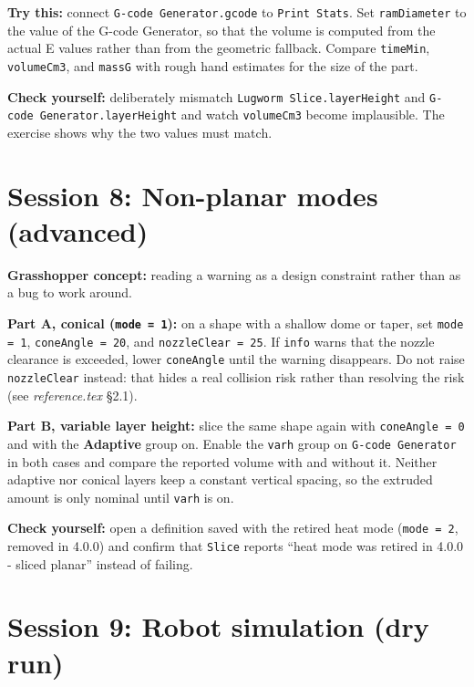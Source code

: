 \documentclass[11pt]{article}
\newcommand{\param}[1]{\texttt{#1}}
\newcommand{\exlabel}[1]{\par\vspace{0.3em}\noindent\textbf{#1:}\enspace}
\begin{document}
\exlabel{Try this} connect \param{G-code Generator.gcode} to
\param{Print Stats}. Set \param{ramDiameter} to the value of
the G-code Generator, so that the volume is computed from the actual E
values rather than from the geometric fallback. Compare
\param{timeMin}, \param{volumeCm3}, and \param{massG} with rough hand
estimates for the size of the part.

\exlabel{Check yourself} deliberately mismatch \param{Lugworm
Slice.layerHeight} and \param{G-code Generator.layerHeight} and
watch \param{volumeCm3} become implausible. The exercise shows why the
two values must match.

\section{Session 8: Non-planar modes (advanced)}

\exlabel{Grasshopper concept} reading a warning as a design constraint
rather than as a bug to work around.

\exlabel{Part A, conical (\param{mode = 1})} on a shape with a shallow
dome or taper, set \param{mode = 1}, \param{coneAngle = 20}, and
\param{nozzleClear = 25}. If \param{info} warns that the nozzle
clearance is exceeded, lower \param{coneAngle} until the warning
disappears. Do not raise \param{nozzleClear} instead: that hides a real
collision risk rather than resolving the risk (see \emph{reference.tex}
\S 2.1).

\exlabel{Part B, variable layer height} slice the same shape again with
\param{coneAngle = 0} and with the \textbf{Adaptive} group on. Enable
the \param{varh} group on \param{G-code Generator} in both cases
and compare the reported volume with and without it. Neither adaptive
nor conical layers keep a constant vertical spacing, so the extruded
amount is only nominal until \param{varh} is on.

\exlabel{Check yourself} open a definition saved with the retired heat
mode (\param{mode = 2}, removed in 4.0.0) and confirm that
\param{Slice} reports ``heat mode was retired in 4.0.0 - sliced
planar'' instead of failing.

\section{Session 9: Robot simulation (dry run)}
\end{document}
